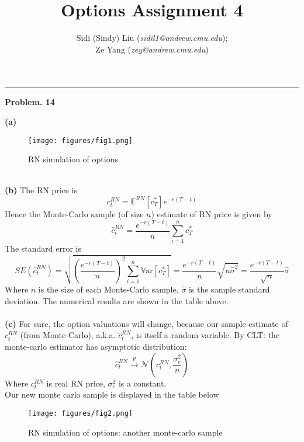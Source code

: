\documentclass[10 pt]{hwtemplate} %
\title{\textbf{Options Assignment 4}}
\author{Sidi (Sindy) Liu (\textit{sidil1@andrew.cmu.edu}); \\ Ze Yang (\textit{zey@andrew.cmu.edu})}
\begin{document}
\maketitle


\noindent\rule{16cm}{0.4pt}
\textbf{Problem. 14} 
\begin{solution} \textbf{(a)}
\begin{figure}[H]
  \centering
  \captionsetup{justification=centering}
  \caption{RN simulation of options}
  \texttt{[image: figures/fig1.png]}
\end{figure}
~\\
\textbf{(b)} The RN price is 
$$
c^{RN}_t = \mathbb{E}^{RN}\left[c^*_T\right] e^{-r(T-t)}
$$
Hence the Monte-Carlo sample (of size $n$) estimate of RN price is given by
\begin{equation}
  \hat{c}^{RN}_t = \frac{e^{-r(T-t)}}{n} \sum_{i=1}^n c^*_T
\end{equation}
The standard error is
\begin{equation}
  SE(\hat{c}^{RN}_t) = \sqrt{\left(\frac{e^{-r(T-t)}}{n}\right)^2 \sum_{i=1}^n \mathrm{\mathbb{V}ar}\left[c^*_T\right]} =\frac{e^{-r(T-t)}}{n} \sqrt{n\hat{\sigma}^2} = \frac{e^{-r(T-t)}}{\sqrt{n}}\hat{\sigma}
\end{equation}
Where $n$ is the size of each Monte-Carlo sample, $\hat{\sigma}$ is the sample standard deviation. The numerical results are shown in the table above. \\
~\\
\textbf{(c)} For sure, the option valuations will change, because our sample estimate of $c^{RN}_t$ (from Monte-Carlo), a.k.a. $\hat{c}^{RN}_t$, is itself a random variable. By CLT: the monte-carlo estimator has asymptotic distribution:
\begin{equation}
  \hat{c}^{RN}_t \xrightarrow{p} \mathcal{N}\left(c^{RN}_t, \frac{\sigma_c^2}{n}\right)
\end{equation}
Where $c^{RN}_t$ is real RN price, $\sigma_c^2$ is a constant.\\
Our new monte carlo sample is displayed in the table below
\begin{figure}[H]
  \centering
  \captionsetup{justification=centering}
  \caption{RN simulation of options: another monte-carlo sample}
  \texttt{[image: figures/fig2.png]}

\end{figure}
\end{solution}
\end{document}
